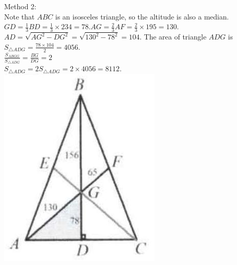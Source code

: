 \documentclass{article}
\begin{document}
Method 2:\\
Note that \(A B C\) is an isosceles triangle, so the altitude is also a median.\\
\(G D=\frac{1}{3} B D=\frac{1}{3} \times 234=78 . A G=\frac{2}{3} A F=\frac{2}{3} \times 195=130\).\\
\(A D=\sqrt{A G^{2}-D G^{2}}=\sqrt{130^{2}-78^{2}}=104\). The area of triangle \(A D G\) is \(S_{\triangle A D G}=\frac{78 \times 104}{2}=4056\).\\
\(\frac{S_{A B G G}}{S_{\triangle A D G}}=\frac{B G}{D G}=2\)\\
\(S_{\triangle A D G}=2 S_{\triangle A D G}=2 \times 4056=8112\).\\
\centering
\includegraphics[width=\textwidth]{images/reasoning_image_1.jpg}
\end{document}
